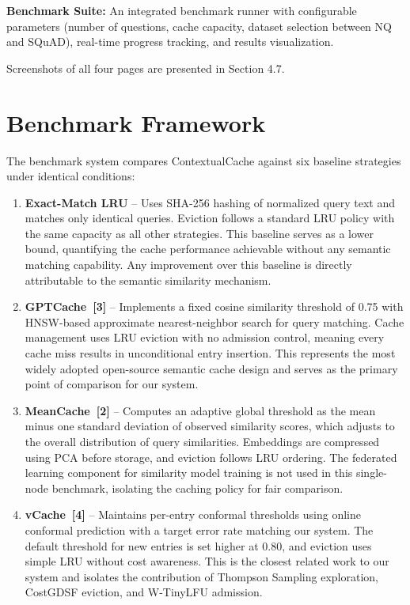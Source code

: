 \documentclass[12pt,a4paper]{report}
\begin{document}
\textbf{Benchmark Suite:} An integrated benchmark runner with configurable parameters (number of questions, cache capacity, dataset selection between NQ and SQuAD), real-time progress tracking, and results visualization.

Screenshots of all four pages are presented in Section 4.7.

\section{Benchmark Framework}

The benchmark system compares ContextualCache against six baseline strategies under identical conditions:

\begin{enumerate}[label=(\roman*),leftmargin=2cm]
\item \textbf{Exact-Match LRU} -- Uses SHA-256 hashing of normalized query text and matches only identical queries. Eviction follows a standard LRU policy with the same capacity as all other strategies. This baseline serves as a lower bound, quantifying the cache performance achievable without any semantic matching capability. Any improvement over this baseline is directly attributable to the semantic similarity mechanism.

\item \textbf{GPTCache~[3]} -- Implements a fixed cosine similarity threshold of 0.75 with HNSW-based approximate nearest-neighbor search for query matching. Cache management uses LRU eviction with no admission control, meaning every cache miss results in unconditional entry insertion. This represents the most widely adopted open-source semantic cache design and serves as the primary point of comparison for our system.

\item \textbf{MeanCache~[2]} -- Computes an adaptive global threshold as the mean minus one standard deviation of observed similarity scores, which adjusts to the overall distribution of query similarities. Embeddings are compressed using PCA before storage, and eviction follows LRU ordering. The federated learning component for similarity model training is not used in this single-node benchmark, isolating the caching policy for fair comparison.

\item \textbf{vCache~[4]} -- Maintains per-entry conformal thresholds using online conformal prediction with a target error rate matching our system. The default threshold for new entries is set higher at 0.80, and eviction uses simple LRU without cost awareness. This is the closest related work to our system and isolates the contribution of Thompson Sampling exploration, CostGDSF eviction, and W-TinyLFU admission.


\end{enumerate}
\end{document}
